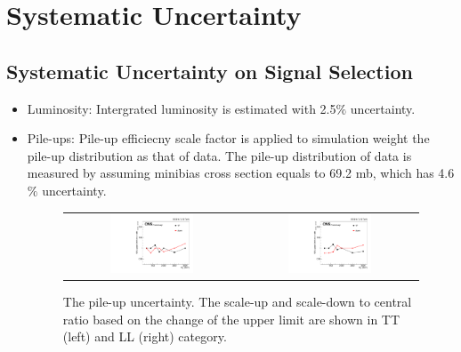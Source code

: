 
\chapter{Systematic Uncertainty} \label{chap:5}

\section{Systematic Uncertainty on Signal Selection} \label{Event reconstruction and selection}

\begin{itemize}
  \item Luminosity: Intergrated luminosity is estimated with 2.5$\% $ uncertainty\citep{CMS-PAS-LUM-17-001}. 
  \item Pile-ups: Pile-up efficiecny scale factor is applied to simulation weight the pile-up distribution as that of data. The pile-up distribution of data is measured by assuming minibias cross section equals to 69.2 mb, which has 4.6$\% $ uncertainty. 
\begin{figure}[t]
  \centering
 \begin{tabular}{cc}
    \includegraphics[width=0.5\textwidth]{Figures/plots_uncert/pu_TT.pdf} &
   \includegraphics[width=0.5\textwidth]{Figures/plots_uncert/pu_LL.pdf} \\
  \end{tabular}
  \caption{The pile-up uncertainty. The scale-up and scale-down to central ratio based on the change of the upper limit are shown in TT (left) and LL (right) category.}
  \label{fig:hvt_brs}
\end{figure}  
   

\end{itemize}
